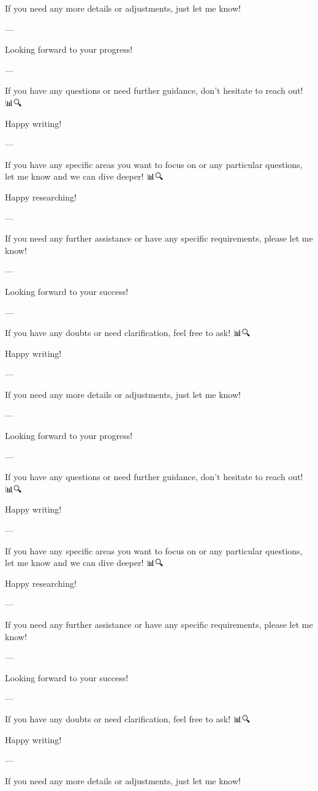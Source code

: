 If you need any more details or adjustments, just let me know! 🙌

--- 

Looking forward to your progress! 🚀🌟

--- 

If you have any questions or need further guidance, don't hesitate to reach out! 📊🔍

Happy writing! 📝✨

--- 

If you have any specific areas you want to focus on or any particular questions, let me know and we can dive deeper! 📊🔍

Happy researching! 📝🚀

--- 

If you need any further assistance or have any specific requirements, please let me know! 🙌

--- 

Looking forward to your success! 🚀🌟

--- 

If you have any doubts or need clarification, feel free to ask! 📊🔍

Happy writing! 📝✨

--- 

If you need any more details or adjustments, just let me know! 🙌

--- 

Looking forward to your progress! 🚀🌟

--- 

If you have any questions or need further guidance, don't hesitate to reach out! 📊🔍

Happy writing! 📝✨

--- 

If you have any specific areas you want to focus on or any particular questions, let me know and we can dive deeper! 📊🔍

Happy researching! 📝🚀

--- 

If you need any further assistance or have any specific requirements, please let me know! 🙌

--- 

Looking forward to your success! 🚀🌟

--- 

If you have any doubts or need clarification, feel free to ask! 📊🔍

Happy writing! 📝✨

--- 

If you need any more details or adjustments, just let me know! 🙌

